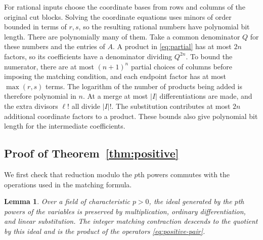 \documentclass[11pt,reqno]{amsart}
\newtheorem{lemma}[theorem]{Lemma}
\theoremstyle{remark}
\numberwithin{equation}{section}
\begin{document}
For rational inputs choose the coordinate bases from rows and columns of
the original cut blocks. Solving the coordinate equations uses minors of
order bounded in terms of \(r,s\), so the resulting rational numbers have
polynomial bit length. There are polynomially many of them. Take a common
denominator \(Q\) for these numbers and the entries of \(A\). A product
in \eqref{eq:partial} has at most \(2n\) factors, so its coefficients
have a denominator dividing \(Q^{2n}\). To bound the numerator, there are
at most \((n+1)^n\) partial choices of columns before imposing the
matching condition, and each endpoint factor has at most \(\max(r,s)\)
terms. The logarithm of the number of products being added is therefore
polynomial in \(n\). At a merge at most \(|I|\) differentiations are
made, and the extra divisors \(\ell!\) all divide \(|I|!\). The
substitution contributes at most \(2n\) additional coordinate factors to
a product. These bounds also give polynomial bit length for the
intermediate coefficients.

\subsection{Proof of Theorem~\ref{thm:positive}}


We first check that reduction modulo the $p$th powers commutes
with the operations used in the matching formula.

\begin{lemma}\label{lem:positive-ideal}
Over a field of characteristic $p>0$, the ideal generated by
the $p$th powers of the variables is preserved
by multiplication, ordinary differentiation, and linear substitution.
The integer matching contraction descends to the quotient by this
ideal and is the product of the operators \eqref{eq:positive-pair}.
\end{lemma}
\end{document}
